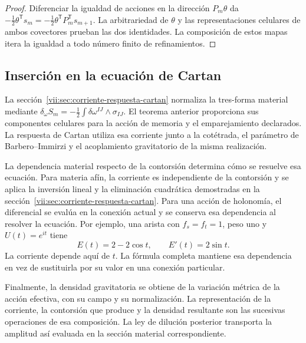 \begin{proof}
Diferenciar la igualdad de acciones en la dirección
\(P_m\theta\) da
\(-\tfrac12\theta^{\mathsf T}s_m
 =-\tfrac12\theta^{\mathsf T}P_m^{\mathsf T}s_{m+1}\).
La arbitrariedad de \(\theta\) y las representaciones celulares
de ambos covectores prueban las dos identidades. La composición de
estos mapas itera la igualdad a todo número finito de refinamientos.
\end{proof}

\subsection{Inserción en la ecuación de Cartan}

La sección~\ref{vii:sec:corriente-respuesta-cartan} normaliza la
tres-forma material mediante
\(\delta_\omega S_m=-\tfrac12\int\delta\omega^{IJ}\wedge
\sigma_{IJ}\). El teorema anterior proporciona sus componentes
celulares para la acción de memoria y el emparejamiento declarados.
La respuesta de Cartan utiliza esa corriente junto a la cotétrada,
el parámetro de Barbero--Immirzi y el acoplamiento gravitatorio de la
misma realización.

La dependencia material respecto de la contorsión determina cómo se
resuelve esa ecuación. Para materia afín, la corriente es independiente
de la contorsión y se aplica la inversión lineal y la eliminación
cuadrática demostradas en la sección~\ref{vii:sec:corriente-respuesta-cartan}.
Para una acción de
holonomía, el diferencial se evalúa en la conexión actual y se conserva
esa dependencia al resolver la ecuación. Por ejemplo, una arista con
\(f_s=f_t=1\), peso uno y \(U(t)=e^{it}\) tiene
\[
 E(t)=2-2\cos t,\qquad E'(t)=2\sin t.
\]
La corriente depende aquí de \(t\). La fórmula completa mantiene
esa dependencia en vez de sustituirla por su valor en una conexión
particular.

Finalmente, la densidad gravitatoria se obtiene de la variación
métrica de la acción efectiva, con su campo y su normalización.
La representación de la corriente, la contorsión que produce y la
densidad resultante son las sucesivas operaciones de esa composición.
La ley de dilución posterior transporta la amplitud así evaluada en
la sección material correspondiente.
